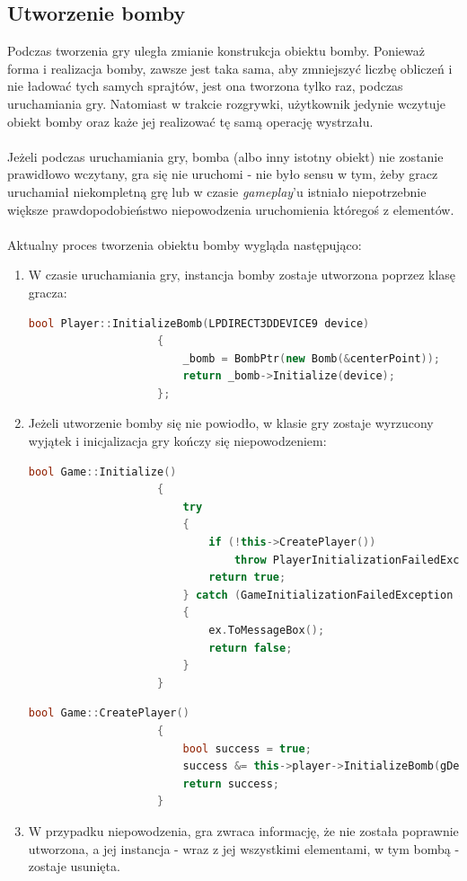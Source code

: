 \documentclass[a4paper,twoside]{article}
\begin{document}
			\subsection{Utworzenie bomby}
				Podczas tworzenia gry uległa zmianie konstrukcja obiektu bomby. Ponieważ forma i realizacja bomby, zawsze jest taka sama, aby zmniejszyć liczbę obliczeń i nie ładować tych samych sprajtów, jest ona tworzona tylko raz, podczas uruchamiania gry. Natomiast w trakcie rozgrywki, użytkownik jedynie wczytuje obiekt bomby oraz każe jej realizować tę samą operację wystrzału.\\\\
				Jeżeli podczas uruchamiania gry, bomba (albo inny istotny obiekt) nie zostanie prawidłowo wczytany, gra się nie uruchomi - nie było sensu w tym, żeby gracz uruchamiał niekompletną grę lub w czasie \textit{gameplay}'u istniało niepotrzebnie większe prawdopodobieństwo niepowodzenia uruchomienia któregoś z elementów.\\\\
				Aktualny proces tworzenia obiektu bomby wygląda następująco:
				\begin{enumerate}
					\item W czasie uruchamiania gry, instancja bomby zostaje utworzona poprzez klasę gracza:
					\begin{lstlisting}[language=C++]
					bool Player::InitializeBomb(LPDIRECT3DDEVICE9 device)
					{
						_bomb = BombPtr(new Bomb(&centerPoint));
						return _bomb->Initialize(device);
					};
					\end{lstlisting}
					\item Jeżeli utworzenie bomby się nie powiodło, w klasie gry zostaje wyrzucony wyjątek i inicjalizacja gry kończy się niepowodzeniem:
					\begin{lstlisting}[language=C++]
					bool Game::Initialize()
					{
						try
						{
							if (!this->CreatePlayer())
								throw PlayerInitializationFailedException();
							return true;
						} catch (GameInitializationFailedException & ex)
						{
							ex.ToMessageBox();
							return false;
						}
					}
					\end{lstlisting}
					\begin{lstlisting}[language=C++]
					bool Game::CreatePlayer()
					{
						bool success = true;
						success &= this->player->InitializeBomb(gDevice->device);
						return success;
					}
					\end{lstlisting}
					\item W przypadku niepowodzenia, gra zwraca informację, że nie została poprawnie utworzona, a jej instancja - wraz z jej wszystkimi elementami, w tym bombą - zostaje usunięta.
				\end{enumerate}
\end{document}
